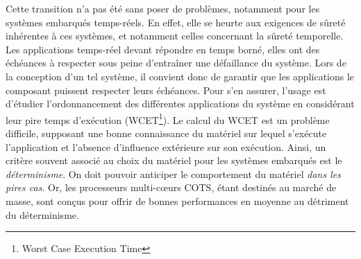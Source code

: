 Cette transition n'a pas été sans poser de problèmes, notamment pour les systèmes embarqués temps-réels.
En effet, elle se heurte aux exigences de sûreté inhérentes à ces systèmes, et notamment celles concernant la sûreté temporelle.
Les applications temps-réel devant répondre en temps borné, elles ont des échéances à respecter sous peine d'entraîner une défaillance du système.
Lors de la conception d'un tel système, il convient donc de garantir que les applications le composant puissent respecter leurs échéances.
Pour s'en assurer, l'usage est d'étudier l'ordonnancement des différentes applications du système en considérant leur pire temps d'exécution (WCET\footnote{Worst Case Execution Time}).
Le calcul du WCET est un problème difficile, supposant une bonne connaissance du matériel sur lequel s'exécute l'application et l'absence d'influence extérieure sur son exécution.
Ainsi, un critère souvent associé au choix du matériel pour les systèmes embarqués est le \emph{déterminisme}.
On doit pouvoir anticiper le comportement du matériel \emph{dans les pires cas}.
Or, les processeurs multi-cœurs COTS, étant destinés au marché de masse, sont conçus pour offrir de bonnes performances en moyenne au détriment du déterminisme.

